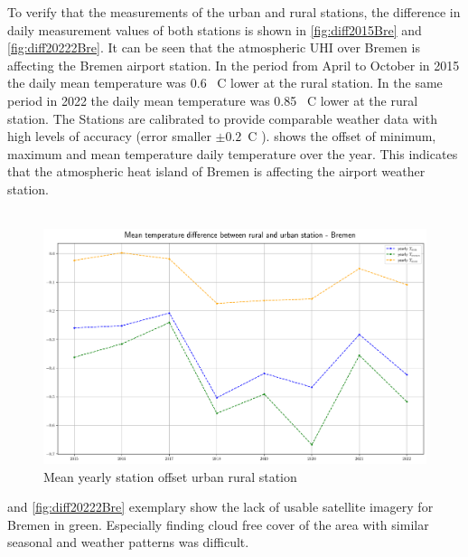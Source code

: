 \documentclass[12pt,a4paper, english,twoside]{scrartcl}
\begin{document}
      To verify that the measurements of the urban and rural stations, the difference in daily measurement values of both stations is shown in \cref{fig:diff2015Bre} and \cref{fig:diff20222Bre}. 
      It can be seen that the atmospheric \gls{UHI} over Bremen is affecting the Bremen airport station. 
      In the period from April to October in 2015 the daily mean temperature was 0.6 \textdegree\ C lower at the rural station. 
      In the same period in 2022 the daily mean temperature was 0.85 \textdegree\ C lower at the rural station. 
      The Stations are calibrated to provide comparable weather data with high levels of accuracy (error smaller $\pm 0.2$\textdegree\ C \autocite{LES2024}). 
       shows the offset of minimum, maximum and mean temperature daily temperature over the year. 
      This indicates that the atmospheric heat island of Bremen is affecting the airport weather station.\\ \\ 
      \begin{figure}[!htbp]
        \begin{center}
        \includegraphics[width=\textwidth]{img/Mean temperature difference between rural and urban station - Bremen.png}
         \end{center}
         \caption{Mean yearly station offset urban rural station}\label{fig:tempurbvsrural}
      \end{figure}
      \noindent
       and \cref{fig:diff20222Bre} exemplary show the lack of usable satellite imagery for Bremen in green. 
      Especially finding cloud free cover of the area with similar seasonal and weather patterns was difficult.
\end{document}
